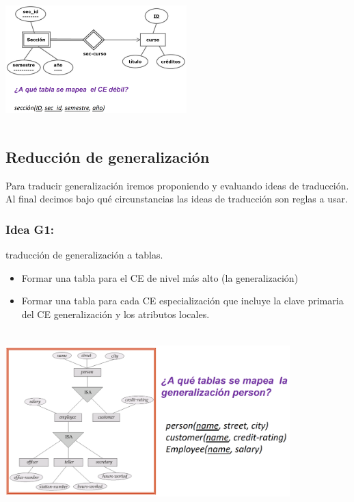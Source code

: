 \documentclass[12pt,a4paper]{report}
\begin{document}
			\begin{center}
				\includegraphics[width=7cm, height=5cm]{./imagenes/ced.png}
			\end{center}
			
		\subsection{Reducción de generalización}
			\par Para traducir generalización iremos proponiendo y evaluando ideas de traducción. Al final decimos bajo qué circunstancias las ideas de traducción son reglas a usar.
			
			\subsubsection{Idea G1:} traducción de generalización a tablas.
				\begin{itemize}
					\item Formar una tabla para el CE de nivel más alto (la generalización)
					\item Formar una tabla para cada CE especialización que incluye la clave primaria del CE generalización y los atributos locales.
				\end{itemize}

				\begin{center}
					\includegraphics[width=11cm, height=7cm]{./imagenes/g1.png}
				\end{center}
			
\end{document}
